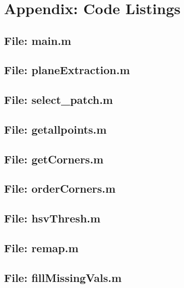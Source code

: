 \documentclass[10pt,a4paper]{article}
\title{  }
\author{}
\date{}
\begin{document}
\maketitle


\newpage
\section{Appendix: Code Listings}

\subsection{File: main.m}

\subsection{File: planeExtraction.m}

\subsection{File: select\_patch.m}

\subsection{File: getallpoints.m}

\subsection{File: getCorners.m}

\subsection{File: orderCorners.m}

\subsection{File: hsvThresh.m}

\subsection{File: remap.m}

\subsection{File: fillMissingVals.m}

\end{document}
